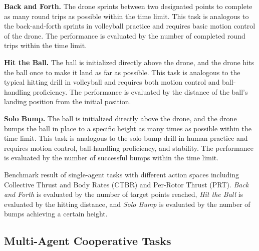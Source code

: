 \textbf{Back and Forth.}
The drone sprints between two designated points to complete as many round trips as possible within the time limit. This task is analogous to the back-and-forth sprints in volleyball practice and requires basic motion control of the drone. The performance is evaluated by the number of completed round trips within the time limit.


\textbf{Hit the Ball.}
The ball is initialized directly above the drone, and the drone hits the ball once to make it land as far as possible. This task is analogous to the typical hitting drill in volleyball and requires both motion control and ball-handling proficiency. The performance is evaluated by the distance of the ball's landing position from the initial position.

\textbf{Solo Bump.}
The ball is initialized directly above the drone, and the drone bumps the ball in place to a specific height as many times as possible within the time limit. This task is analogous to the solo bump drill in human practice and requires motion control, ball-handling proficiency, and stability. The performance is evaluated by the number of successful bumps within the time limit.



\begin{table*}[t]
    \centering
    
    \caption{Benchmark result of single-agent tasks with different action spaces including Collective Thrust and Body Rates (CTBR) and Per-Rotor Thrust (PRT). \textit{Back and Forth} is evaluated by the number of target points reached, \textit{Hit the Ball} is evaluated by the hitting distance, and \textit{Solo Bump} is evaluated by the number of bumps achieving a certain height.}
    \label{tab:single}
\end{table*}

\subsection{Multi-Agent Cooperative Tasks}

